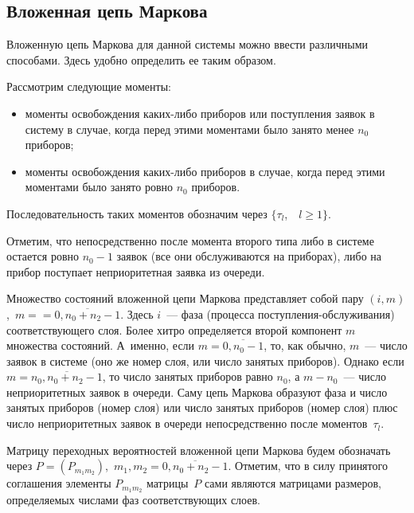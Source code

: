 \begin{multicols}{2}
\section{Вложенная цепь Маркова}

Вложенную цепь Маркова для данной системы можно ввести различными
способами.
Здесь удобно определить ее таким образом.

Рассмотрим следующие моменты:
\begin{itemize}
\item моменты освобождения каких-либо приборов или поступления
заявок в систему в случае, когда перед этими моментами было
занято менее $n_0$ приборов;
\item
моменты освобождения каких-либо приборов в случае, когда
перед этими моментами было занято ровно $n_0$ приборов.
\end{itemize}

Последовательность таких моментов обозначим через
$\{\tau_l$,\ \ $l\ge 1\}$.

Отметим, что непосредственно после момента второго типа либо в
системе остается ровно $n_0-1$ заявок (все они обслуживаются
на приборах), либо на прибор поступает неприоритетная заявка
из очереди.

Множество состояний вложенной цепи Маркова представляет собой
пару $(i,m)$,\  $m=$\linebreak $=\overline{0,n_0+n_2-1}$.
Здесь $i$~--- фаза (процесса по\-ступ\-ле\-ния-об\-слу\-жи\-ва\-ния)
соответствующего слоя.
Более хитро определяется второй компонент $m$ множества
состояний.
А~именно, если $m=\overline{0,n_0-1}$, то, как обычно,
$m$~--- число заявок в системе (оно же номер слоя, или число
занятых приборов).
Однако если $m=\overline{n_0,n_0+n_2-1}$,
то число занятых приборов равно $n_0$, а $m-n_0$~---
число неприоритетных заявок в очереди.
Саму цепь Маркова образуют фаза и число занятых приборов
(номер слоя) или число занятых приборов (номер слоя) плюс
число неприоритетных заявок в очереди непосредственно после
моментов~$\tau_l$.

Матрицу переходных вероятностей вложенной цепи Маркова будем
обозначать через
$P = (P_{m_1m_2})$,\ $m_1,m_2=\overline{0,n_0+n_2-1}$.
Отметим, что в силу принятого соглашения элементы $P_{m_1m_2}$
мат\-ри\-цы~$P$ сами являются матрицами размеров,
определяемых числами фаз соответствующих слоев.


\end{multicols}
